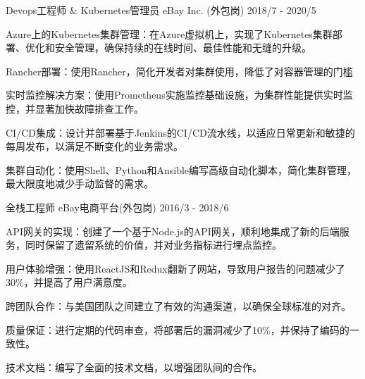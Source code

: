 \begin{cventries}
  \cventry
    {Devops工程师 \& Kubernetes管理员} %
    {eBay Inc. \tiny{(外包岗)}} %
    {} %
    {2018/7 - 2020/5} %
    {
      \begin{cvitems} %
        \item {Azure上的Kubernetes集群管理：在Azure虚拟机上，实现了Kubernetes集群部署、优化和安全管理，确保持续的在线时间、最佳性能和无缝的升级。}
        \item {Rancher部署：使用Rancher，简化开发者对集群使用，降低了对容器管理的门槛 }
        \item {实时监控解决方案：使用Prometheus实施监控基础设施，为集群性能提供实时监控，并显著加快故障排查工作。        }
        \item {CI/CD集成：设计并部署基于Jenkins的CI/CD流水线，以适应日常更新和敏捷的每周发布，以满足不断变化的业务需求。        }
        \item { 集群自动化：使用Shell、Python和Ansible编写高级自动化脚本，简化集群管理，最大限度地减少手动监督的需求。       }
      \end{cvitems}
    }
 

  \cventry
    {全栈工程师} %
    {eBay电商平台\tiny{(外包岗)}} %
    {} %
    {2016/3 - 2018/6} %
    {
      \begin{cvitems} %
        \item {API网关的实现：创建了一个基于Node.js的API网关，顺利地集成了新的后端服务，同时保留了遗留系统的价值，并对业务指标进行埋点监控。 }
        \item {用户体验增强：使用ReactJS和Redux翻新了网站，导致用户报告的问题减少了30\%，并提高了用户满意度。 }
        \item {跨团队合作：与美国团队之间建立了有效的沟通渠道，以确保全球标准的对齐。  }
        \item {质量保证：进行定期的代码审查，将部署后的漏洞减少了10\%，并保持了编码的一致性。  }
        \item {技术文档：编写了全面的技术文档，以增强团队间的合作。 }
      \end{cvitems}
    }


\end{cventries}
